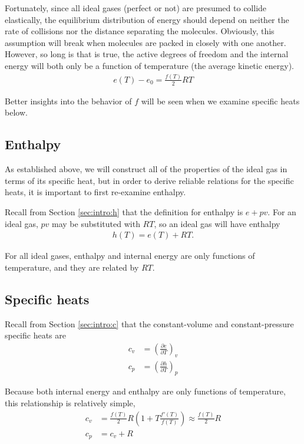 Fortunately, since all ideal gases (perfect or not) are presumed to collide elastically, the equilibrium distribution of energy should depend on neither the rate of collisions nor the distance separating the molecules.  Obviously, this assumption will break when molecules are packed in closely with one another.  However, so long is that is true, the active degrees of freedom and the internal energy will both only be a function of temperature (the average kinetic energy).
\begin{align}
e(T) - e_0 = \frac{f(T)}{2} R T \label{eqn:ig:efromt}
\end{align}

Better insights into the behavior of $f$ will be seen when we examine specific heats below.

\subsection{Enthalpy}

As established above, we will construct all of the properties of the ideal gas in terms of its specific heat, but in order to derive reliable relations for the specific heats, it is important to first re-examine enthalpy.

Recall from Section \ref{sec:intro:h} that the definition for enthalpy is $e + pv$.  For an ideal gas, $pv$ may be substituted with $R T$, so an ideal gas will have enthalpy
\begin{align}
h(T) = e(T) + RT.\label{eqn:ig:hfrome}
\end{align}

For all ideal gases, enthalpy and internal energy are only functions of temperature, and they are related by $RT$.

\subsection{Specific heats}

Recall from Section \ref{sec:intro:c} that the constant-volume and constant-pressure specific heats are
\begin{align}
c_v &= \left( \frac{\partial e}{\partial T} \right)_v\nonumber\\
c_p &= \left( \frac{\partial h}{\partial T} \right)_p\nonumber
\end{align}

Because both internal energy and enthalpy are only functions of temperature, this relationship is relatively simple,
\begin{align}
c_v &= \frac{f(T)}{2} R \left( 1 + T\frac{f'(T)}{f(T)}\right) \approx \frac{f(T)}{2} R \label{eqn:ig:cvfromt}\\
c_p &= c_v + R
\end{align}

